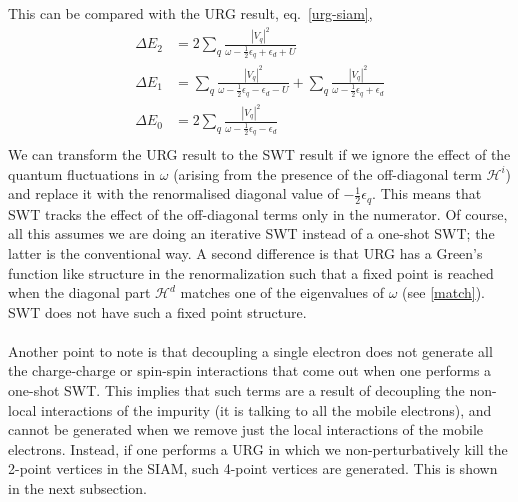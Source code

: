 \documentclass[twoside,11pt]{report}
\numberwithin{equation}{section}
\begin{document}
This can be compared with the URG result, eq.~\ref{urg-siam},
\begin{equation}\begin{aligned}
\Delta E_2 &= 2\sum_{q}\frac{|V_q|^2}{\omega - \frac{1}{2}\epsilon_q + \epsilon_d + U}\\
\Delta E_1 &= \sum_{q}\frac{|V_q|^2}{\omega - \frac{1}{2}\epsilon_q - \epsilon_d - U} + \sum_{q}\frac{|V_q|^2}{\omega - \frac{1}{2}\epsilon_q + \epsilon_d}\\
\Delta E_0 &= 2\sum_{q}\frac{|V_q|^2}{\omega - \frac{1}{2}\epsilon_q - \epsilon_d}\\
\end{aligned}\end{equation}
We can transform the URG result to the SWT result if we ignore the effect of the quantum fluctuations in \(\omega\) (arising from the presence of the off-diagonal term \(\mathcal{H}^i\)) and replace it with the renormalised diagonal value of \(-\frac{1}{2}\epsilon_q\). This means that SWT tracks the effect of the off-diagonal terms only in the numerator. Of course, all this assumes we are doing an iterative SWT instead of a one-shot SWT; the latter is the conventional way. A second difference is that URG has a Green's function like structure in the renormalization such that a fixed point is reached when the diagonal part \(\mathcal{H}^d\) matches one of the eigenvalues of \(\omega\) (see \ref{match}). SWT does not have such a fixed point structure.
\\\\Another point to note is that decoupling a single electron does not generate all the charge-charge or spin-spin interactions that come out when one performs a one-shot SWT. This implies that such terms are a result of decoupling the non-local interactions of the impurity (it is talking to all the mobile electrons), and cannot be generated when we remove just the local interactions of the mobile electrons. Instead, if one performs a URG in which we non-perturbatively kill the 2-point vertices in the SIAM, such 4-point vertices are generated. This is shown in the next subsection.
\end{document}
